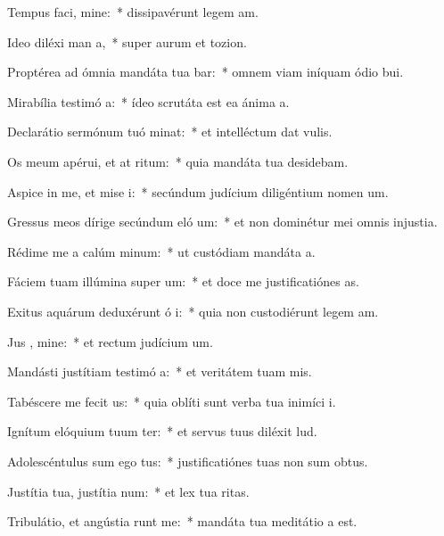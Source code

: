 \item Tempus faci, mine:~* dissipavérunt legem am.
\item Ideo diléxi man a,~* super aurum et tozion.
\item Proptérea ad ómnia mandáta tua bar:~* omnem viam iníquam ódio bui.
\item Mirabília testimó a:~* ídeo scrutáta est ea ánima a.
\item Declarátio sermónum tuó minat:~* et intelléctum dat vulis.
\item Os meum apérui, et at ritum:~* quia mandáta tua desidebam.
\item Aspice in me, et mise i:~* secúndum judícium diligéntium nomen um.
\item Gressus meos dírige secúndum eló um:~* et non dominétur mei omnis injustia.
\item Rédime me a calúm minum:~* ut custódiam mandáta a.
\item Fáciem tuam illúmina super  um:~* et doce me justificatiónes as.
\item Exitus aquárum deduxérunt ó i:~* quia non custodiérunt legem am.
\item Jus , mine:~* et rectum judícium um.
\item Mandásti justítiam testimó a:~* et veritátem tuam mis.
\item Tabéscere me fecit  us:~* quia oblíti sunt verba tua inimíci i.
\item Ignítum elóquium tuum ter:~* et servus tuus diléxit lud.
\item Adolescéntulus sum ego  tus:~* justificatiónes tuas non sum obtus.
\item Justítia tua, justítia  num:~* et lex tua ritas.
\item Tribulátio, et angústia runt me:~* mandáta tua meditátio a est.
